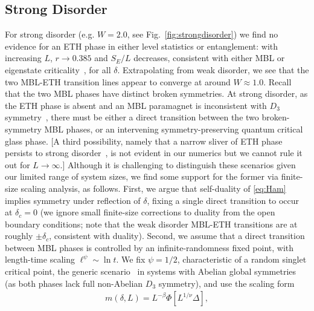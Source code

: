 \documentclass[prb,aps, twocolumn, superscriptaddress]{revtex4-1}
\newcommand{\be}{\begin{eqnarray}}
\newcommand{\ee}{\end{eqnarray}}
\begin{document}
\subsection{Strong Disorder} For strong disorder (e.g. $W=2.0$, see Fig.~\ref{fig:strongdisorder}) we find no evidence for an ETH phase in either level statistics or entanglement: with increasing $L$, $r\rightarrow 0.385$ and $S_{E}/L$ decreases, consistent with either MBL or eigenstate criticality~\cite{QCGPRL}, for all $\delta$. Extrapolating from weak disorder, we see that the two MBL-ETH transition lines appear to converge at around $W\approx 1.0$. Recall that the two  MBL phases have distinct broken symmetries. At strong disorder, as the ETH phase is absent and an MBL paramagnet is inconsistent with $D_3$ symmetry~\cite{PhysRevB.94.224206}, there must be either a direct transition between the two broken-symmetry MBL phases, or an intervening symmetry-preserving quantum critical glass phase. [A third possibility, namely that a narrow sliver of ETH phase persists to strong disorder~\cite{deRoeckHuveneers,deRoeckImbrie, HusePersonal}, is not evident in our numerics but we cannot rule it out for $L\rightarrow \infty$.] Although it is challenging to distinguish these scenarios given our limited range of system size{s}, we find some support for the former via finite-size scaling analysis, as follows. First, we argue that self-duality of \eqref{eq:Ham} implies symmetry under reflection of $\delta$, fixing a single direct transition to occur at $\delta_c=0$ (we ignore small finite-size corrections to duality from the open boundary conditions; note that the weak disorder {MBL-ETH} transitions are at {roughly} $\pm \delta_c$, consistent with duality). Second, we assume that a direct transition between MBL phases is controlled by an infinite-randomness fixed point, with length-time scaling $\ell^\psi \sim \ln t$. We fix $\psi=1/2$, characteristic of a random singlet critical point, the generic scenario~\cite{SenthilPotts} in systems with Abelian global symmetries (as both phases lack  full non-Abelian $D_3$ symmetry), and use the scaling form
\be\label{eq:scalingform}
 m(\delta, L) = L^{-\beta} \Phi\left[{L}^{1/\nu}\Delta\right],
\ee
\end{document}
